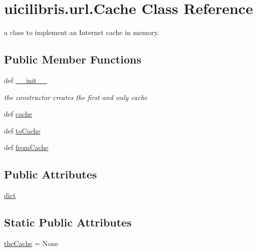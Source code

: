 \hypertarget{classuicilibris_1_1url_1_1Cache}{\section{uicilibris.\-url.\-Cache \-Class \-Reference}
\label{classuicilibris_1_1url_1_1Cache}
}


a class to implement an \-Internet cache in memory.  


\subsection*{\-Public \-Member \-Functions}
\begin{DoxyCompactItemize}
\item 
def \hyperlink{classuicilibris_1_1url_1_1Cache_a84a9c5222527e7d175a5a43c3b823f2a}{\-\_\-\-\_\-init\-\_\-\-\_\-}
\begin{DoxyCompactList}\small\item\em the constructor creates the first and only cache \end{DoxyCompactList}\item 
def \hyperlink{classuicilibris_1_1url_1_1Cache_ac3d1a2f0813606132d96a016470aca2b}{cache}
\item 
def \hyperlink{classuicilibris_1_1url_1_1Cache_a33cf49c872029b07282d9bd2d1e267f0}{to\-Cache}
\item 
def \hyperlink{classuicilibris_1_1url_1_1Cache_a756831fa5c88a681e1826010156fe03e}{from\-Cache}
\end{DoxyCompactItemize}
\subsection*{\-Public \-Attributes}
\begin{DoxyCompactItemize}
\item 
\hyperlink{classuicilibris_1_1url_1_1Cache_ac7e0c129e67571f01ce9cb519d6f9393}{dict}
\end{DoxyCompactItemize}
\subsection*{\-Static \-Public \-Attributes}
\begin{DoxyCompactItemize}
\item 
\hyperlink{classuicilibris_1_1url_1_1Cache_ab1394c9f1b1806cac5148ac421431ad5}{the\-Cache} = \-None
\end{DoxyCompactItemize}


